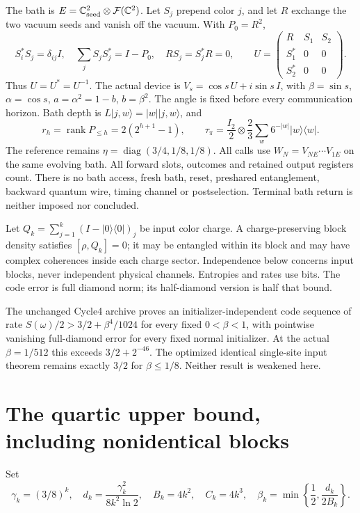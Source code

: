 \documentclass[11pt]{article}
\newcommand{\rank}{\operatorname{rank}}
\newcommand{\ket}[1]{\lvert #1\rangle}
\begin{document}
The bath is $E=\mathbb C^2_{\rm seed}\otimes\mathcal F(\mathbb C^2)$.
Let $S_j$ prepend color $j$, and let $R$ exchange the two vacuum seeds and
vanish off the vacuum. With $P_0=R^2$,
\[
 S_i^*S_j=\delta_{ij}I,\quad \sum_jS_jS_j^*=I-P_0,\quad
 RS_j=S_j^*R=0,\qquad
 U=\begin{pmatrix}R&S_1&S_2\\S_1^*&0&0\\S_2^*&0&0\end{pmatrix}.
\]
Thus $U=U^*=U^{-1}$. The actual device is
$V_s=\cos s\,U+i\sin s\,I$, with
$\beta=\sin s$, $\alpha=\cos s$, $a=\alpha^2=1-b$, $b=\beta^2$.
The angle is fixed before every communication horizon.
Bath depth is $L\ket{j,w}=|w|\ket{j,w}$, and
\[
 r_h=\rank P_{\le h}=2(2^{h+1}-1),\qquad
 \tau_\pi=\frac{I_2}{2}\otimes\frac23\sum_w6^{-|w|}|w\rangle\langle w|.
 \tag{1}
\]
The reference remains $\eta=\operatorname{diag}(3/4,1/8,1/8)$.
All calls use $W_N=V_{NE}\cdots V_{1E}$ on the same evolving bath.
All forward slots, outcomes and retained output registers count.
There is no bath access, fresh bath, reset, preshared entanglement,
backward quantum wire, timing channel or postselection.
Terminal bath return is neither imposed nor concluded.

Let $Q_k=\sum_{j=1}^k(I-|0\rangle\langle0|)_j$ be input color charge.
A charge-preserving block density satisfies $[\rho,Q_k]=0$; it may be
entangled within its block and may have complex coherences inside each
charge sector. Independence below concerns input blocks, never independent
physical channels. Entropies and rates use bits. The code error is full
diamond norm; its half-diamond version is half that bound.

The unchanged Cycle4 archive \cite{Cycle4} proves an initializer-independent
code sequence of rate $S(\omega)/2>3/2+\beta^4/1024$ for every fixed
$0<\beta<1$, with pointwise vanishing full-diamond error for every fixed
normal initializer. At the actual $\beta=1/512$ this exceeds $3/2+2^{-46}$.
The optimized identical single-site input theorem remains exactly $3/2$
for $\beta\le1/8$. Neither result is weakened here.

\section{The quartic upper bound, including nonidentical blocks}

Set
\[
 \gamma_k=(3/8)^k,\quad
 d_k=\frac{\gamma_k^2}{8k^2\ln2},\quad
 B_k=4k^2,\quad C_k=4k^3,\quad
 \beta_k=\min\!\left\{\frac12,\frac{d_k}{2B_k}\right\}.
 \tag{2}
\]
\end{document}
